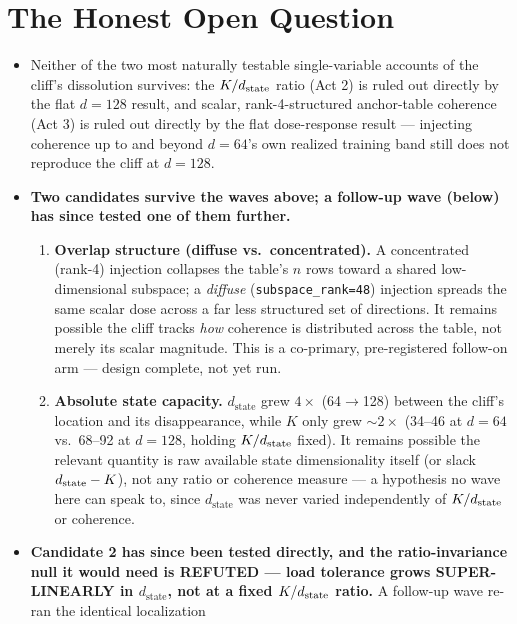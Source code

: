\section{The Honest Open Question}
\label{sec:open-question}

\begin{itemize}
  \item Neither of the two most naturally testable single-variable accounts
    of the cliff's dissolution survives: the $K/d_{\mathrm{state}}$ ratio (Act 2)
    is ruled out directly by the flat $d=128$ result, and scalar,
    rank-4-structured anchor-table coherence (Act 3) is ruled out directly
    by the flat dose-response result --- injecting coherence up to and
    beyond $d=64$'s own realized training band still does not reproduce
    the cliff at $d=128$.
  \item \textbf{Two candidates survive the waves above; a follow-up wave
    (below) has since tested one of them further.}
  \begin{enumerate}
    \item \textbf{Overlap structure (diffuse vs.\ concentrated).} A
      concentrated (rank-4) injection collapses the table's $n$ rows toward
      a shared low-dimensional subspace; a \emph{diffuse}
      (\texttt{subspace\_rank=48}) injection spreads the same scalar dose
      across a far less structured set of directions. It remains possible
      the cliff tracks \emph{how} coherence is distributed across the
      table, not merely its scalar magnitude. This is a co-primary,
      pre-registered follow-on arm --- design complete, not yet run.
    \item \textbf{Absolute state capacity.} $d_{\mathrm{state}}$ grew
      $4\times$ (64$\to$128) between the cliff's location and its
      disappearance, while $K$ only grew $\sim\!2\times$ (34--46 at $d=64$
      vs.\ 68--92 at $d=128$, holding $K/d_{\mathrm{state}}$ fixed). It remains
      possible the relevant quantity is raw available state dimensionality
      itself (or slack $d_{\mathrm{state}} - K$), not any ratio or coherence measure
      --- a hypothesis no wave here can speak to, since $d_{\mathrm{state}}$
      was never varied independently of $K/d_{\mathrm{state}}$ or coherence.
  \end{enumerate}
  \item \textbf{Candidate 2 has since been tested directly, and the
    ratio-invariance null it would need is REFUTED --- load tolerance
    grows SUPER-LINEARLY in $d_{\mathrm{state}}$, not at a fixed
    $K/d_{\mathrm{state}}$ ratio.} A follow-up wave re-ran the identical localization

\end{itemize}
